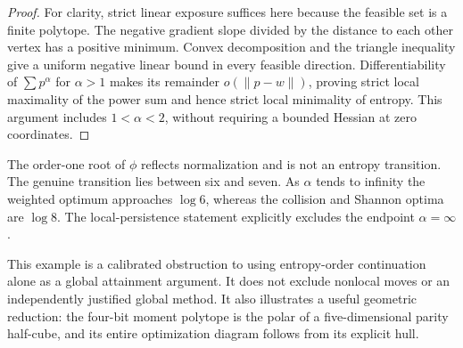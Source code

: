 \documentclass[11pt]{article}
\begin{document}
\begin{proof}
For clarity, strict linear exposure suffices here because the feasible
set is a finite polytope. The negative gradient slope divided by the
distance to each other vertex has a positive minimum. Convex
decomposition and the triangle inequality give a uniform negative
linear bound in every feasible direction. Differentiability of
$\sum p^\alpha$ for $\alpha>1$ makes its remainder $o(\|p-w\|)$,
proving strict local maximality of the power sum and hence strict
local minimality of entropy. This argument includes $1<\alpha<2$,
without requiring a bounded Hessian at zero coordinates.
\end{proof}

The order-one root of $\phi$ reflects normalization and is not an
entropy transition. The genuine transition lies between six and seven.
As $\alpha$ tends to infinity the weighted optimum approaches
$\log6$, whereas the collision and Shannon optima are $\log8$.
The local-persistence statement explicitly excludes the endpoint
$\alpha=\infty$.

This example is a calibrated obstruction to using entropy-order
continuation alone as a global attainment argument. It does not
exclude nonlocal moves or an independently justified global method.
It also illustrates a useful geometric reduction: the four-bit
moment polytope is the polar of a five-dimensional parity half-cube,
and its entire optimization diagram follows from its explicit hull.
\end{document}
